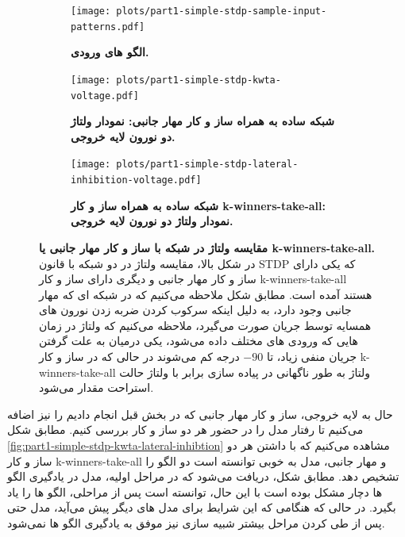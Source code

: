     \begin{figure}[!ht]
        \centering
            \begin{subfigure}[b]{0.8\textwidth}
                \centering
                \texttt{[image: plots/part1-simple-stdp-sample-input-patterns.pdf]}
                \caption{\textbf{الگو های ورودی.}}
                \label{fig:part1-simple-stdp-sample-input-patterns}
            \end{subfigure}
            \vfill
            \begin{subfigure}[b]{0.8\textwidth}
                \centering
                \texttt{[image: plots/part1-simple-stdp-kwta-voltage.pdf]}
                \caption{\textbf{شبکه ساده به همراه ساز و کار مهار جانبی: نمودار ولتاژ دو نورون لایه خروجی.}}
                \label{fig:part1-simple-stdp-kwta-voltage}
            \end{subfigure}
            \vfill
            \begin{subfigure}[b]{0.8\textwidth}
                \centering
                \texttt{[image: plots/part1-simple-stdp-lateral-inhibition-voltage.pdf]}
                \caption{\textbf{شبکه ساده به همراه ساز و کار 
                k-winners-take-all:
                نمودار ولتاژ دو نورون لایه خروجی.}}
                \label{fig:part1-simple-stdp-kwta-voltage}
            \end{subfigure}
        \caption{\textbf{مقایسه ولتاژ در شبکه با ساز و کار مهار جانبی یا 
        k-winners-take-all.} در شکل بالا، مقایسه ولتاژ در دو شبکه با قانون 
        STDP 
        که یکی دارای ساز و کار مهار جانبی و دیگری دارای ساز و کار 
        k-winners-take-all 
        هستند آمده است. مطابق شکل ملاحظه می‌کنیم که در شبکه ای که مهار جانبی وجود دارد، به دلیل اینکه سرکوب کردن ضربه زدن نورون های همسایه توسط جریان صورت می‌گیرد، ملاحظه می‌کنیم که ولتاژ در زمان هایی که ورودی های مختلف داده می‌شود، یکی درمیان به علت گرفتن جریان منفی زیاد، تا $-90$ درجه کم می‌شوند در حالی که در ساز و کار 
        k-winners-take-all 
        ولتاژ به طور ناگهانی در پیاده سازی برابر با ولتاژ حالت استراحت مقدار می‌شود.}
        \label{fig:part1-simple-stdp-KWTA-and-LI-voltage-compare}
    \end{figure}


    حال به لایه خروجی، ساز و کار مهار جانبی که در بخش قبل انجام دادیم را نیز اضافه می‌کنیم تا رفتار مدل را در حضور هر دو ساز و کار بررسی کنیم. مطابق شکل 
    \ref{fig:part1-simple-stdp-kwta-lateral-inhibtion}
    مشاهده می‌کنیم که با داشتن هر دو ساز و کار 
    k-winners-take-all 
    و مهار جانبی، مدل به خوبی توانسته است دو الگو را تشخیص دهد. مطابق شکل، دریافت می‌شود که در مراحل اولیه، مدل در یادگیری الگو ها دچار مشکل بوده است با این حال، توانسته است پس از مراحلی، الگو ها را یاد بگیرد. در حالی که هنگامی که این شرایط برای مدل های دیگر پیش می‌آید، مدل حتی پس از طی کردن مراحل بیشتر شبیه سازی نیز موفق به یادگیری الگو ها نمی‌شود.

